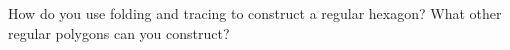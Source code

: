 \begin{ques}
How do you use folding and tracing to construct a regular hexagon?
What other regular polygons can you construct?
\end{ques}
\QM












